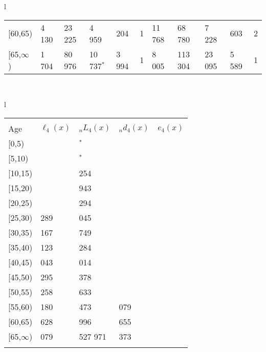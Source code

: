 \documentclass[
]{article}
\begin{document}
\begin{table}
\begin{tabular}[t]{l}
\begin{tabular}
{}[60,65) & 4 130 & 23 225 & 4 959 & 204 & 1 & 11 768 & 68 780 & 7 228 & 603 & 2\\
{}[65,$\infty$) & 1 704 & 80 976 & 10 737$^{*}$ & 3 994 & 1 & 8 005 & 113 304 & 23 095 & 5 589 & 1\\
\end{tabular}\\
\end{tabular}
\centering
\begin{tabular}[t]{l}
\hline
\begin{tabular}{>{\raggedright\arraybackslash}p{.43in}>{\raggedleft\arraybackslash}p{1.3in}>{\raggedleft\arraybackslash}p{1.3in}>{\raggedleft\arraybackslash}p{1.3in}>{\raggedleft\arraybackslash}p{1.3in}}
\toprule
\multicolumn{1}{c}{ } & \multicolumn{4}{c}{(4) Lost both} \\
\cmidrule(l{3pt}r{3pt}){2-5}
Age & $\ell_{4}(x)$ & ${}_nL_{4}(x)$ & ${}_nd_{4}(x)$ & $e_{4}(x)$\\
\midrule
{}[0,5) & 0 & 141$^{*}$ & 0 & 24\\
{}[5,10) & 140 & 757$^{*}$ & 0 & 24\\
{}[10,15) & 140 & 1 254 & 0 & 24\\
{}[15,20) & 292 & 1 943 & 1 & 24\\
{}[20,25) & 661 & 4 294 & 3 & 24\\
\addlinespace
{}[25,30) & 1 289 & 10 045 & 7 & 24\\
{}[30,35) & 2 167 & 16 749 & 12 & 24\\
{}[35,40) & 3 123 & 26 284 & 27 & 24\\
{}[40,45) & 6 043 & 50 014 & 70 & 24\\
{}[45,50) & 11 295 & 85 378 & 189 & 23\\
\addlinespace
{}[50,55) & 17 258 & 134 633 & 480 & 23\\
{}[55,60) & 27 180 & 199 473 & 1 079 & 22\\
{}[60,65) & 42 628 & 302 996 & 2 655 & 20\\
{}[65,$\infty$) & 53 079 & 1 527 971 & 75 373 & 17\\
\bottomrule
\multicolumn{5}{l}{\rule{0pt}{1em}\textsuperscript{*} Based on an estimated from SIPP with less than 10 respondents in the numerator.}\\
\end{tabular}\\
\end{tabular}
\end{table}
\end{document}
